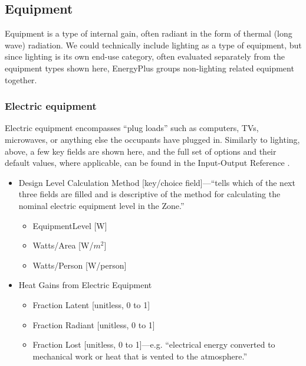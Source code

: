 \documentclass[10pt]{article}
\begin{document}
\subsection{Equipment}

Equipment is a type of internal gain, often  radiant in the form of thermal (long wave) radiation. We could technically include lighting as a type of equipment, but since lighting is its own end-use category, often evaluated separately from the equipment types shown here, EnergyPlus groups non-lighting related equipment together.

\subsubsection{Electric equipment}

Electric equipment encompasses ``plug loads'' such as computers, TVs, microwaves, or anything else the occupants have plugged in. Similarly to lighting, above, a few key fields are shown here, and the full set of options and their default values, where applicable, can be found in the Input-Output Reference \cite{EPdocs9inputoutput}.

\begin{itemize}
    \setlength{\itemsep}{0pt}%
    \setlength{\parskip}{0pt}%
\item Design Level Calculation Method [key/choice field]---``tells which of the next three fields are filled and is descriptive of
the method for calculating the nominal electric equipment level in the Zone.'' \cite{EPdocs9inputoutput}

\begin{itemize}
    \setlength{\itemsep}{0pt}%
    \setlength{\parskip}{0pt}%
    \item EquipmentLevel [W]
    \item Watts/Area [W/$m^2$]
    \item Watts/Person [W/person]
\end{itemize}
\item Heat Gains from Electric Equipment 
\begin{itemize}
    \setlength{\itemsep}{0pt}%
    \setlength{\parskip}{0pt}%
    \item Fraction Latent [unitless, 0 to 1]
    \item Fraction Radiant [unitless, 0 to 1]
    \item Fraction Lost [unitless, 0 to 1]---e.g. ``electrical energy converted to mechanical
work or heat that is vented to the atmosphere.'' \cite{EPdocs9inputoutput}
\end{itemize}

\end{itemize}
\vspace{-6pt}
\end{document}
